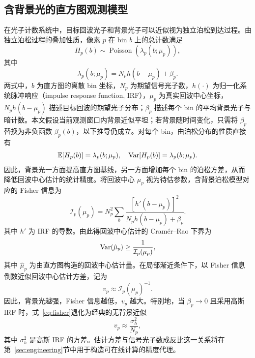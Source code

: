 
\subsection{含背景光的直方图观测模型}
\label{sec:spad}

在光子计数系统中，目标回波光子和背景光子可以近似视为独立泊松到达过程。由独立泊松过程的叠加性质，像素 $p$ 在 bin $b$ 上的总计数满足
\begin{equation}
    H_p(b)
    \sim
    \operatorname{Poisson}\!\left(\lambda_p(b;\mu_p)\right),
    \label{eq:poisson_obs}
\end{equation}
其中
\begin{equation}
    \lambda_p(b;\mu_p)
    =
    N_p h(b-\mu_p)+\beta_p.
    \label{eq:lambda_background}
\end{equation}
两式中，$b$ 为直方图的离散 bin 坐标，$N_p$ 为期望信号光子数，$h(\cdot)$ 为归一化系统脉冲响应（impulse response function, IRF），$\mu_p$ 为真实回波中心坐标，$N_p h(b-\mu_p)$ 描述目标回波的期望光子分布；$\beta_p$ 描述每个 bin 的平均背景光子与暗计数。本文假设当前观测窗口内背景近似平坦；若背景随时间变化，只需将 $\beta_p$ 替换为非负函数 $\beta_p(b)$，以下推导仍成立。对每个 bin，由泊松分布的性质直接有
\begin{equation}
    \mathbb{E}[H_p(b)] = \lambda_p(b;\mu_p),
    \quad
    \operatorname{Var}[H_p(b)] = \lambda_p(b;\mu_p).
    \label{eq:poisson_moments_bg}
\end{equation}
因此，背景光一方面提高直方图基线，另一方面增加每个 bin 的泊松方差，从而降低回波中心估计的统计精度。将回波中心 $\mu_p$ 视为待估参数，含背景泊松模型对应的 Fisher 信息为
\begin{equation}
    \mathcal I_p(\mu_p)
    =
    N_p^2
    \sum_b
    \frac{[h'(b-\mu_p)]^2}
    {N_p h(b-\mu_p)+\beta_p}.
    \label{eq:fisher}
\end{equation}
其中 $h'$ 为 IRF 的导数。由此得回波中心估计的 Cram\'er--Rao 下界为
\begin{equation}
    \operatorname{Var}(\hat\mu_p)
    \geq
    \frac{1}{\mathcal I_p(\mu_p)},
    \label{eq:crlb_bg}
\end{equation}
其中 $\hat\mu_p$ 为由直方图构造的回波中心估计量。在局部渐近条件下，以 Fisher 信息倒数近似回波中心估计方差，记为
\begin{equation}
    v_p
    \approx
    \mathcal I_p(\mu_p)^{-1}.
    \label{eq:v_from_fisher}
\end{equation}
因此，背景光越强，Fisher 信息越低，$v_p$ 越大。特别地，当 $\beta_p\rightarrow0$ 且采用高斯 IRF 时，式~\eqref{eq:fisher}退化为经典的无背景近似
\begin{equation}
    v_p\approx\frac{\sigma_h^2}{N_p},
    \label{eq:v_classical}
\end{equation}
其中 $\sigma_h^2$ 是高斯 IRF 的方差。估计方差与信号光子数成反比这一关系将在第~\ref{sec:engineering}节中用于构造可在线计算的精度代理。
